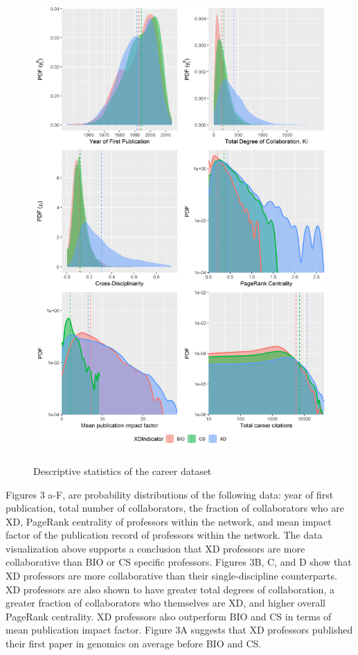 \documentclass[10pt]{article}         %
\begin{document}
\begin{figure}[!htb]
  \centering
  \includegraphics[width=12cm, height=18cm]{Fig3All.png}
  \caption{Descriptive statistics of the career dataset}
  \label{Fig3}
\end{figure}

Figures 3 a-F, are probability distributions of the following data: year of first publication, total number of collaborators, the fraction of collaborators who are XD, PageRank centrality of professors within the network, and mean impact factor of the publication record of professors within the network. The data visualization above supports a conclusion that XD professors are more collaborative than BIO or CS specific professors. Figures 3B, C, and D show that XD professors are more collaborative than their single-discipline counterparts. XD professors are also shown to have greater total degrees of collaboration, a greater fraction of collaborators who themselves are XD, and higher overall PageRank centrality. XD professors also outperform BIO and CS in terms of mean publication impact factor. Figure 3A suggests that XD professors published their first paper in genomics on average before BIO and CS. 
\end{document}
